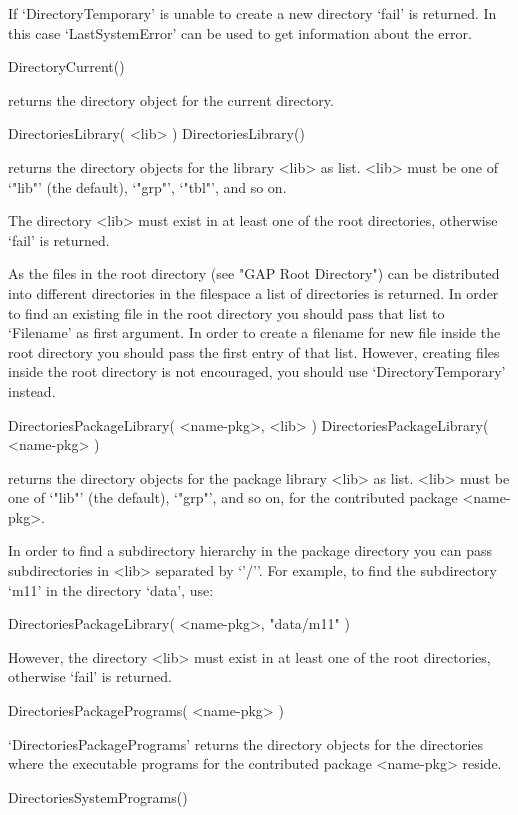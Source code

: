 If `DirectoryTemporary' is   unable to create a  new  directory `fail' is
returned.  In this case `LastSystemError' can be  used to get information
about the error.

\>DirectoryCurrent()

returns the directory object for the current directory.

\>DirectoriesLibrary( <lib> )
\)DirectoriesLibrary()

returns the  directory objects  for  the  {\GAP}  library <lib>  as list.
<lib> must be one of `"lib"' (the default), `"grp"', `"tbl"', and so on.

The directory <lib> must exist in at  least one of the root directories,
otherwise `fail' is returned.

As the files in the {\GAP} root  directory (see "GAP Root Directory") can
be  distributed  into different  directories in the  filespace  a list of
directories is returned.  In order to find an existing file in the {\GAP}
root directory you should pass that list to `Filename' as first argument.
In order to  create  a filename   for  new file  inside the  {\GAP}  root
directory you   should pass  the first  entry    of that list.   However,
creating files  inside the {\GAP} root  directory is not  encouraged, you
should use `DirectoryTemporary' instead.

\>DirectoriesPackageLibrary( <name-pkg>, <lib> )
\)DirectoriesPackageLibrary( <name-pkg> )

returns  the   directory objects  for   the   package library   <lib>  as
list. <lib> must be one of `"lib"' (the default), `"grp"', and so on, for
the contributed package <name-pkg>.

In order to  find a subdirectory hierarchy in  the package  directory you
can  pass subdirectories in <lib> separated  by `{'/'}'.  For example, to
find the subdirectory `m11' in the directory `data', use:

\begintt
    DirectoriesPackageLibrary( <name-pkg>, "data/m11" )
\endtt

However,   the directory <lib>  must  exist in at   least one of the root
directories, otherwise `fail' is returned.

\>DirectoriesPackagePrograms( <name-pkg> )

`DirectoriesPackagePrograms'   returns  the directory   objects   for the
directories where the  executable programs  for the contributed   package
<name-pkg> reside.

\>DirectoriesSystemPrograms()

